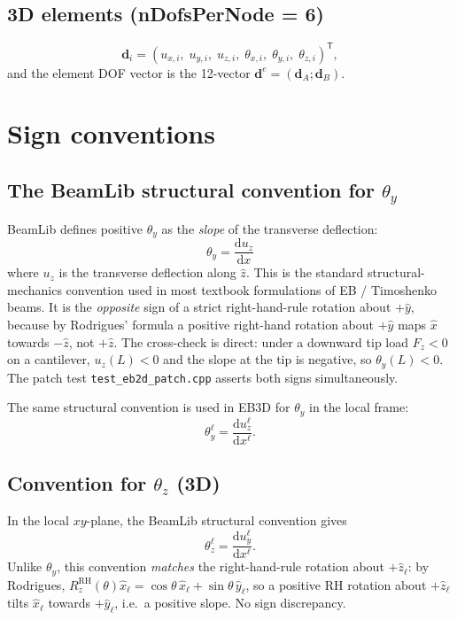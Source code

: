 \documentclass[11pt,a4paper]{book}
\newcommand{\dd}{\mathrm{d}}
\newcommand{\bmath}[1]{\boldsymbol{#1}}
\newcommand{\xhat}{\hat{x}}
\newcommand{\yhat}{\hat{y}}
\newcommand{\zhat}{\hat{z}}
\newcommand{\xhatl}{\hat{x}_\ell}
\newcommand{\yhatl}{\hat{y}_\ell}
\newcommand{\zhatl}{\hat{z}_\ell}
\begin{document}
\subsection{3D elements (nDofsPerNode = 6)}

\[
\bmath{d}_i = (u_{x,i},\; u_{y,i},\; u_{z,i},\; \theta_{x,i},\; \theta_{y,i},\; \theta_{z,i})^\mathsf{T},
\]
and the element DOF vector is the 12-vector $\bmath{d}^e = (\bmath{d}_A; \bmath{d}_B)$.

\section{Sign conventions}\label{sec:signs}

\subsection{The BeamLib structural convention for \texorpdfstring{$\theta_y$}{theta\_y}}

BeamLib defines positive $\theta_y$ as the \emph{slope} of the transverse deflection:
\[
\boxed{\;\theta_y = \dfrac{\dd u_z}{\dd x}\;}
\]
where $u_z$ is the transverse deflection along $\zhat$. This is the standard structural-mechanics convention used in most textbook formulations of EB / Timoshenko beams. It is the \emph{opposite} sign of a strict right-hand-rule rotation about $+\yhat$, because by Rodrigues' formula a positive right-hand rotation about $+\yhat$ maps $\xhat$ towards $-\zhat$, not $+\zhat$. The cross-check is direct: under a downward tip load $F_z < 0$ on a cantilever, $u_z(L) < 0$ and the slope at the tip is negative, so $\theta_y(L) < 0$. The patch test \texttt{test\_eb2d\_patch.cpp} asserts both signs simultaneously.

The same structural convention is used in EB3D for $\theta_y$ in the local frame:
\[
\theta_y^\ell = \frac{\dd u_z^\ell}{\dd x^\ell}.
\]

\subsection{Convention for \texorpdfstring{$\theta_z$}{theta\_z} (3D)}

In the local $xy$-plane, the BeamLib structural convention gives
\[
\theta_z^\ell = \frac{\dd u_y^\ell}{\dd x^\ell}.
\]
Unlike $\theta_y$, this convention \emph{matches} the right-hand-rule rotation about $+\zhatl$: by Rodrigues, $R_z^{\mathrm{RH}}(\theta)\xhatl = \cos\theta\,\xhatl + \sin\theta\,\yhatl$, so a positive RH rotation about $+\zhatl$ tilts $\xhatl$ towards $+\yhatl$, i.e.\ a positive slope. No sign discrepancy.
\end{document}
